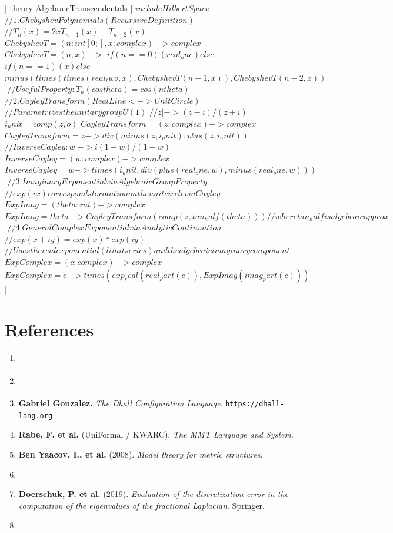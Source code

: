 \documentclass{stex}
\begin{document}
\uplinline| theory AlgebraicTranscendentals {| 
\uplinline$    include HilbertSpace$
\uplinline$    $
\uplinline$    // 1. Chebyshev Polynomials (Recursive Definition)$
\uplinline$    // T_n(x) = 2x T_{n-1}(x) - T_{n-2}(x)$
\uplinline$    ChebyshevT = (n: int[0;], x: complex) -> complex$
\uplinline$    ChebyshevT = (n, x) ->$
\uplinline$      if (n == 0) (real_one) else$
\uplinline$      if (n == 1) (x) else$
\uplinline$      minus(times(times(real_two, x), ChebyshevT(n-1, x)), ChebyshevT(n-2, x))$
\uplinline$    $
\uplinline$    // Useful Property: T_n(cos theta) = cos(n theta)$
\uplinline$    $
\uplinline$    // 2. Cayley Transform (Real Line <-> Unit Circle)$
\uplinline$    // Parametrizes the unitary group U(1)$
\uplinline$    // z |-> (z - i)/(z + i)$
\uplinline$    i_unit = comp(z, o)$
\uplinline$    CayleyTransform = (z: complex) -> complex$
\uplinline$    CayleyTransform = z -> div(minus(z, i_unit), plus(z, i_unit))$
\uplinline$    $
\uplinline$    // Inverse Cayley: w |-> i(1 + w)/(1 - w)$
\uplinline$    InverseCayley = (w: complex) -> complex$
\uplinline$    InverseCayley = w -> times(i_unit, div(plus(real_one, w), minus(real_one, w)))$
\uplinline$    $
\uplinline$    // 3. Imaginary Exponential via Algebraic Group Property$
\uplinline$    // exp(ix) corresponds to rotation on the unit circle via Cayley$
\uplinline$    ExpImag = (theta: rat) -> complex$
\uplinline$    ExpImag = theta -> CayleyTransform(comp(z, tan_half(theta))) // where tan_half is algebraic approx$
\uplinline$    $
\uplinline$    // 4. General Complex Exponential via Analytic Continuation$
\uplinline$    // exp(x + iy) = exp(x) * exp(iy)$
\uplinline$    // Uses the real exponential (limit series) and the algebraic imaginary component$
\uplinline$    ExpComplex = (c: complex) -> complex$
\uplinline$    ExpComplex = c -> times(exp_real(real_part(c)), ExpImag(imag_part(c)))$
\uplinline|  }| 

\section*{References}

\begin{enumerate}
    \item \cite{mehlerUeberEntwicklungFunction1866}
    \item \cite{koppermanLTheoryHilbertSpaces1967}
    \item \textbf{Gabriel Gonzalez.} \textit{The Dhall Configuration Language}. \texttt{https://dhall-lang.org}
    \item \textbf{Rabe, F. et al.} (UniFormal / KWARC). \textit{The MMT Language and System}.
    \item \textbf{Ben Yaacov, I., et al.} (2008). \textit{Model theory for metric structures}.
    \item \cite{hashimotoShiftinvertRationalKrylov2019}
    \item \textbf{Doerschuk, P. et al.} (2019). \textit{Evaluation of the discretization error in the computation of the eigenvalues of the fractional Laplacian}. Springer.
    \item \cite{loshchilovNGPTNormalizedTransformer2024}
\end{enumerate}


{}

\end{document}
